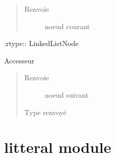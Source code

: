 \documentclass[letterpaper,10pt,french]{sphinxmanual}
\begin{document}
\begin{fulllineitems}
\begin{fulllineitems}
\begin{quote}
\begin{description}
\item[{Renvoie}] \leavevmode
noeud courant

\end{description}\end{quote}

:rtype:: LinkedListNode

\end{fulllineitems}


\begin{fulllineitems}
\label{\detokenize{linkedlistnode:linkedlistnode.LinkedListNode.next}}
Accesseur
\begin{quote}\begin{description}
\item[{Renvoie}] \leavevmode
noeud suivant

\item[{Type renvoyé}] \leavevmode
{\hyperref[\detokenize{linkedlistnode:linkedlistnode.LinkedListNode}]{}}

\end{description}\end{quote}

\end{fulllineitems}


\end{fulllineitems}



\section{litteral module}
\label{\detokenize{litteral:module-litteral}}\label{\detokenize{litteral:litteral-module}}\label{\detokenize{litteral::doc}}\label{\detokenize{litteral:module-litteral}}
\end{document}
